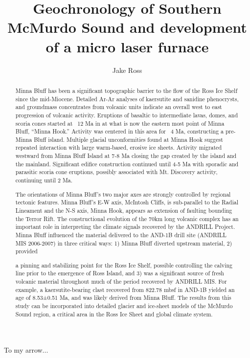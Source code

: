 \documentclass[12pt]{report}
\author{Jake Ross}
\title{Geochronology of Southern McMurdo Sound and development of a micro laser furnace}
\begin{document}
%
%
\begin{dedication}
{To my arrow...}
\end{dedication}
%
%
\titlepage
%
%
\begin{abstract}
Minna Bluff has been a significant topographic barrier to the flow of the Ross Ice Shelf since the mid-Miocene. Detailed Ar-Ar analyses of kaersutite and sanidine phenocrysts, and groundmass concentrates from volcanic units indicate an overall west to east progression of volcanic activity.  Eruptions of basaltic to intermediate lavas, domes, and scoria cones started at ~12 Ma in at what is now the eastern most point of Minna Bluff, “Minna Hook.” Activity was centered in this area for ~4 Ma, constructing a pre-Minna Bluff island. Multiple glacial unconformities found at Minna Hook suggest repeated interaction with large warm-based, erosive ice sheets. Activity migrated westward from Minna Bluff Island at 7-8 Ma closing the gap created by the island and the mainland. Significant edifice construction continued until 4-5 Ma with sporadic and parasitic scoria cone eruptions, possibly associated with Mt. Discovery activity, continuing until 2 Ma. 

The orientations of Minna Bluff’s two major axes are strongly controlled by regional tectonic features. Minna Bluff’s E-W axis, McIntosh Cliffs, is sub-parallel to the Radial Lineament and the N-S axis, Minna Hook, appears as extension of faulting bounding the Terror Rift. The constructional evolution of the 70km long volcanic complex has an important role in interpreting the climate signals recovered by the ANDRILL Project. Minna Bluff influenced the material delivered to the AND-1B drill site (ANDRILL MIS 2006-2007) in three critical ways: 1) Minna Bluff diverted upstream material, 2) provided

a pinning and stabilizing point for the Ross Ice Shelf, possible controlling the calving line prior to the emergence of Ross Island, and 3) was a significant source of fresh volcanic material throughout much of the period recovered by ANDRILL MIS. For example, a kaersutite-bearing clast recovered from 822.78 mbsf in AND-1B yielded an age of 8.53±0.51 Ma, and was likely derived from Minna Bluff.  The results from this study can be incorporated into detailed glacier and ice-sheet models of the McMurdo Sound region, a critical area in the Ross Ice Sheet and global climate system. \cite{Jourdan:2007vi}





\end{abstract}
\end{document}
